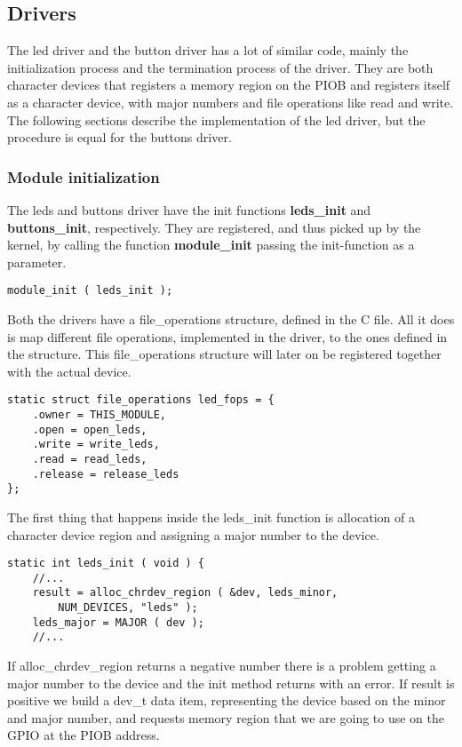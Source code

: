 \subsection{Drivers}
The led driver and the button driver has a lot of similar code, mainly 
the initialization process and the termination process of the driver. 
They are both character devices that registers a memory region on the 
PIOB and registers itself as a character device, with major numbers and 
file operations like read and write. The following sections 
describe the implementation of the led driver, but the procedure is equal for the buttons driver.

\subsubsection{Module initialization}
The leds and buttons driver have the init functions \textbf{leds\_init}
and \textbf{buttons\_init}, respectively. They are registered, and thus 
picked up by the kernel, by calling the function \textbf{module\_init}
passing the init-function as a parameter.
\\
\begin{lstlisting}
module_init ( leds_init );
\end{lstlisting}
Both the drivers have a file\_operations structure,
defined in the C file. All it does is map different file operations,
implemented in the driver, to the ones defined in the structure.
This file\_operations structure will later on be registered together
with the actual device.
\\
\begin{lstlisting}
static struct file_operations led_fops = {
	.owner = THIS_MODULE,
	.open = open_leds,
	.write = write_leds,
	.read = read_leds,
	.release = release_leds
};
\end{lstlisting}
The first thing that happens inside the leds\_init function
is allocation of a character device region
and assigning a major number to the device.
\\
\begin{lstlisting}
static int leds_init ( void ) {
	//...
	result = alloc_chrdev_region ( &dev, leds_minor, 
		NUM_DEVICES, "leds" );
	leds_major = MAJOR ( dev );
	//...
\end{lstlisting}
If alloc\_chrdev\_region returns a negative number there is a problem getting
a major number to the device and the init method returns with an error.
If result is positive we build a dev\_t data item, 
representing the device based on the minor and major number, and requests memory region that we are going to use on the GPIO at the PIOB address.
